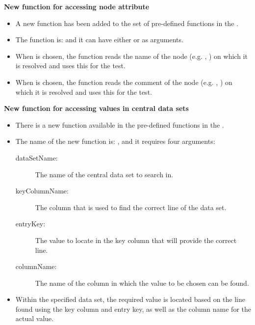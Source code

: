 \textbf{New function for accessing node attribute}
\begin{itemize}
\item A new function has been added to the set of pre-defined functions in the \ite{}.
\item The function is:  and it can have either  or  as arguments.
\item When  is chosen, the function reads the name of the node (e.g. \gdcase{}, \gdstep{}) on which it is resolved and uses this for the test.
\item  When  is chosen, the function reads the comment of the node (e.g. \gdcase{}, \gdstep{}) on which it is resolved and uses this for the test.
\end{itemize}

\textbf{New function for accessing values in central data sets}
\begin{itemize}
\item There is a new function available in the pre-defined functions in the \ite{}.
\item The name of the new function is: , and it requires four arguments:
\begin{description}
\item [dataSetName:]{The name of the central data set to search in.}
\item [keyColumnName:]{The column that is used to find the correct line of the data set.}
\item [entryKey:]{The value to locate in the key column that will provide the correct line.}
\item [columnName:]{The name of the column in which the value to be chosen can be found.}
\end{description}
\item Within the specified data set, the required value is located based on the line found using the key column and entry key, as well as the column name for the actual value. 
\end{itemize}

